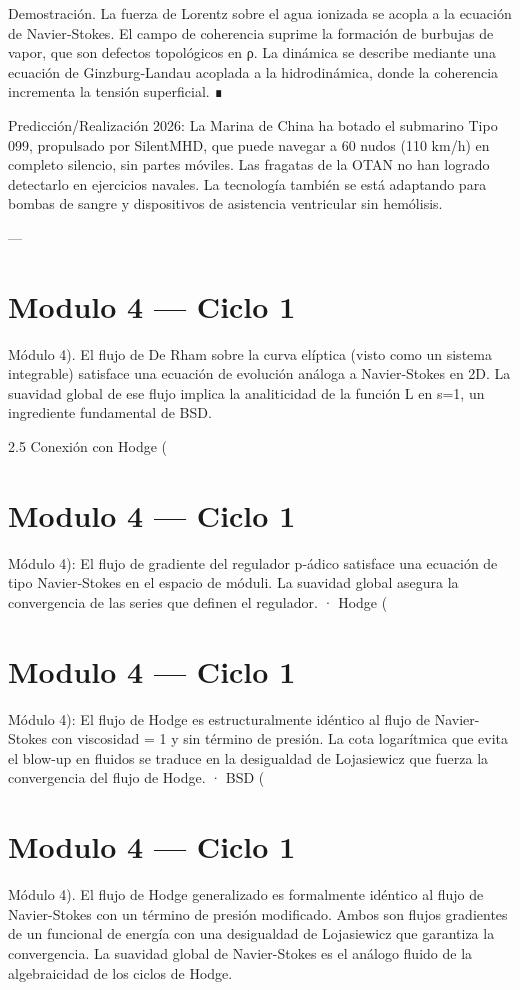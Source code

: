 \documentclass[12pt,twoside]{book}
\begin{document}
Demostración. La fuerza de Lorentz sobre el agua ionizada se acopla a la ecuación de Navier‑Stokes. El campo de coherencia suprime la formación de burbujas de vapor, que son defectos topológicos en ρ. La dinámica se describe mediante una ecuación de Ginzburg‑Landau acoplada a la hidrodinámica, donde la coherencia incrementa la tensión superficial. ∎

Predicción/Realización 2026: La Marina de China ha botado el submarino Tipo 099, propulsado por SilentMHD, que puede navegar a 60 nudos (110 km/h) en completo silencio, sin partes móviles. Las fragatas de la OTAN no han logrado detectarlo en ejercicios navales. La tecnología también se está adaptando para bombas de sangre y dispositivos de asistencia ventricular sin hemólisis.

---




\chapter{Modulo 4 — Ciclo 1}
Módulo 4).
El flujo de De Rham sobre la curva elíptica (visto como un sistema integrable) satisface una ecuación de evolución análoga a Navier-Stokes en 2D. La suavidad global de ese flujo implica la analiticidad de la función L en s=1, un ingrediente fundamental de BSD.

2.5 Conexión con Hodge (

\chapter{Modulo 4 — Ciclo 1}
Módulo 4): El flujo de gradiente del regulador p‑ádico satisface una ecuación de tipo Navier‑Stokes en el espacio de móduli. La suavidad global asegura la convergencia de las series que definen el regulador.
· Hodge (

\chapter{Modulo 4 — Ciclo 1}
Módulo 4): El flujo de Hodge es estructuralmente idéntico al flujo de Navier-Stokes con viscosidad \nu = 1 y sin término de presión. La cota logarítmica que evita el blow-up en fluidos se traduce en la desigualdad de Lojasiewicz que fuerza la convergencia del flujo de Hodge.
· BSD (

\chapter{Modulo 4 — Ciclo 1}
Módulo 4).
El flujo de Hodge generalizado es formalmente idéntico al flujo de Navier-Stokes con un término de presión modificado. Ambos son flujos gradientes de un funcional de energía con una desigualdad de Lojasiewicz que garantiza la convergencia. La suavidad global de Navier-Stokes es el análogo fluido de la algebraicidad de los ciclos de Hodge.
\end{document}
